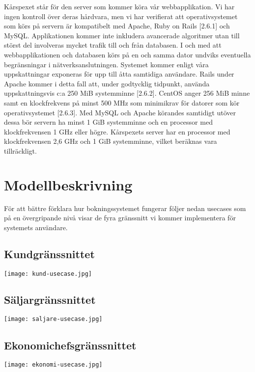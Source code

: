 \documentclass[a4paper, twoside, 11pt, titlepage]{article}
\begin{document}
	Kårspexet står för den server som kommer köra vår webbapplikation. Vi har ingen kontroll över deras hårdvara, men vi har verifierat att operativsystemet som körs på servern är kompatibelt med Apache, Ruby on Rails [2.6.1] och MySQL. Applikationen kommer inte inkludera avancerade algoritmer utan till störst del involveras mycket trafik till och från databasen. I och med att webbapplikationen och databasen körs på en och samma dator undviks eventuella begränsningar i nätverksanslutningen. Systemet kommer enligt våra uppskattningar exponeras för upp till åtta samtidiga användare. Rails under Apache kommer i detta fall att, under godtycklig tidpunkt, använda uppskattningsvis c:a 250 MiB systemminne [2.6.2]. CentOS anger 256 MiB minne samt en klockfrekvens på minst 500 MHz som minimikrav för datorer som kör operativsystemet [2.6.3]. Med MySQL och Apache körandes samtidigt utöver dessa bör servern ha minst 1 GiB systemminne och en processor med klockfrekvensen 1 GHz eller högre. Kårspexets server har en processor med klockfrekvensen 2,6 GHz och 1 GiB systemminne, vilket beräknas vara tillräckligt.

\clearpage
\section{Modellbeskrivning}


För att bättre förklara hur bokningssystemet fungerar följer nedan usecases som på en övergripande nivå visar de fyra gränssnitt vi kommer implementera för systemets användare.

	\subsection{Kundgränssnittet}


	\texttt{[image: kund-usecase.jpg]}

	\subsection{Säljargränssnittet}


	\texttt{[image: saljare-usecase.jpg]}

	\subsection{Ekonomichefsgränssnittet}


	\texttt{[image: ekonomi-usecase.jpg]}
\end{document}
